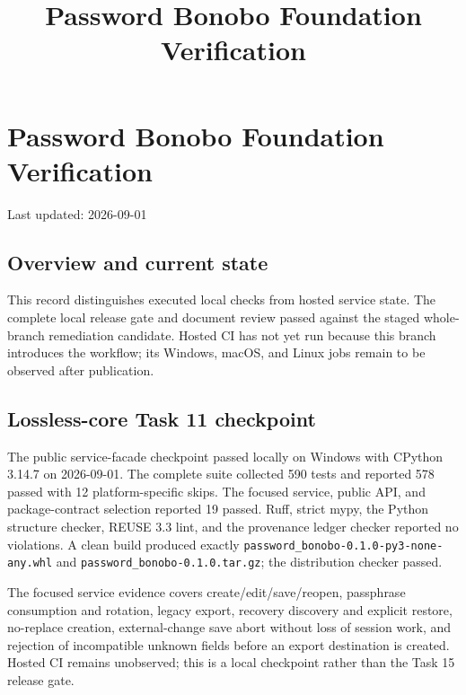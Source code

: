 \documentclass[
  letterpaper,
]{article}
\title{Password Bonobo Foundation Verification}
\author{}
\date{}
\newcounter{none} %
\begin{document}
\maketitle

{
\setcounter{tocdepth}{3}
\tableofcontents
}
\section{Password Bonobo Foundation Verification}\label{password-bonobo-foundation-verification}

Last updated: 2026-09-01

\subsection{Overview and current state}\label{overview-and-current-state}

This record distinguishes executed local checks from hosted service state. The complete local release gate and document
review passed against the staged whole-branch remediation candidate. Hosted CI has not yet run because this branch
introduces the workflow; its Windows, macOS, and Linux jobs remain to be observed after publication.

\subsection{Lossless-core Task 11 checkpoint}\label{lossless-core-task-11-checkpoint}

The public service-facade checkpoint passed locally on Windows with CPython 3.14.7 on 2026-09-01. The complete suite
collected 590 tests and reported 578 passed with 12 platform-specific skips. The focused service, public API, and
package-contract selection reported 19 passed. Ruff, strict mypy, the Python structure checker, REUSE 3.3 lint, and the
provenance ledger checker reported no violations. A clean build produced exactly
\nolinkurl{password_bonobo-0.1.0-py3-none-any.whl} and \nolinkurl{password_bonobo-0.1.0.tar.gz}; the distribution
checker passed.

The focused service evidence covers create/edit/save/reopen, passphrase consumption and rotation, legacy export,
recovery discovery and explicit restore, no-replace creation, external-change save abort without loss of session work,
and rejection of incompatible unknown fields before an export destination is created. Hosted CI remains unobserved; this
is a local checkpoint rather than the Task 15 release gate.
\end{document}
